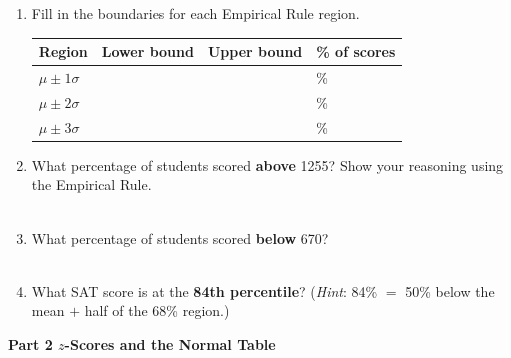 \documentclass[10pt]{article}
\begin{document}
\begin{enumerate}[leftmargin=1.5em, itemsep=8pt]

  \item Fill in the boundaries for each Empirical Rule region.\\[6pt]
        \renewcommand{\arraystretch}{1.5}
        \begin{tabularx}{\linewidth}{@{} l Y Y Y @{}}
        Region & Lower bound & Upper bound & \% of scores \\
        \midrule
        $\mu \pm 1\sigma$ &  &  & \% \\
        $\mu \pm 2\sigma$ &  &  & \% \\
        $\mu \pm 3\sigma$ &  &  & \% \\
        \end{tabularx}

  \item What percentage of students scored \textbf{above} 1255?
        Show your reasoning using the Empirical Rule.\\[5pt]
        \\[1pt]

  \item What percentage of students scored \textbf{below} 670?\\[5pt]
        \\[1pt]

  \item What SAT score is at the \textbf{84th percentile}?
        (\textit{Hint}: 84\% $=$ 50\% below the mean $+$ half of the 68\% region.)\\[5pt]

\end{enumerate}

\vspace{0.12in}

{\large\bfseries\color{navy} Part 2 \quad $z$-Scores and the Normal Table}

\vspace{0.10in}
\end{document}
